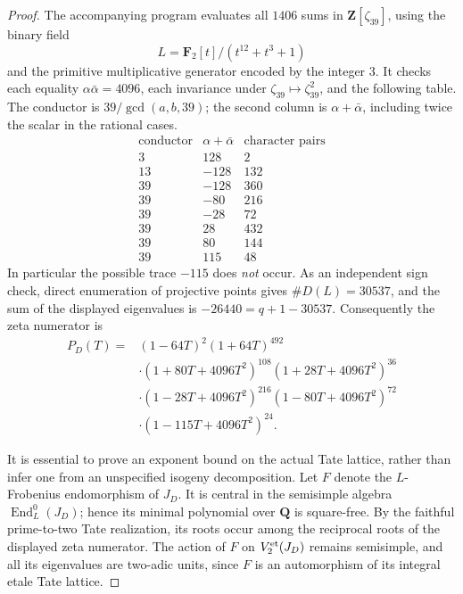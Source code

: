 \documentclass[11pt]{article}
\begin{document}
\begin{proof}
The accompanying program evaluates all \(1406\) sums in
\(\mathbf Z[\zeta_{39}]\), using the binary field
\[
              L=\mathbf F_2[t]/(t^{12}+t^3+1)
\]
and the primitive multiplicative generator encoded by the
integer \(3\). It checks each equality
\(\alpha\bar\alpha=4096\), each invariance under
\(\zeta_{39}\mapsto\zeta_{39}^2\), and the following table.
The conductor is \(39/\gcd(a,b,39)\); the second column
is \(\alpha+\bar\alpha\), including twice the scalar in
the rational cases.
\[
\begin{array}{r|r|r}
 \text{conductor}&\alpha+\bar\alpha&\text{character pairs}\\ \hline
 3&128&2\\
 13&-128&132\\
 39&-128&360\\
 39&-80&216\\
 39&-28&72\\
 39&28&432\\
 39&80&144\\
 39&115&48
\end{array}
\]
In particular the possible trace \(-115\) does \emph{not}
occur. As an independent sign check, direct enumeration
of projective points gives \(\#D(L)=30537\), and the
sum of the displayed eigenvalues is \(-26440=q+1-30537\).
Consequently the zeta numerator is
\[
\begin{aligned}
 P_D(T)={}&(1-64T)^2(1+64T)^{492}\\
 &\cdot(1+80T+4096T^2)^{108}
        (1+28T+4096T^2)^{36}\\
 &\cdot(1-28T+4096T^2)^{216}
        (1-80T+4096T^2)^{72}\\
 &\cdot(1-115T+4096T^2)^{24}.
\end{aligned}
\]

It is essential to prove an exponent bound on the actual
Tate lattice, rather than infer one from an unspecified
isogeny decomposition. Let \(F\) denote the \(L\)-Frobenius
endomorphism of \(J_D\). It is central in the semisimple
algebra \(\operatorname{End}_L^0(J_D)\); hence its minimal
polynomial over \(\mathbf Q\) is square-free. By the
faithful prime-to-two Tate realization, its roots occur
among the reciprocal roots of the displayed zeta numerator. The action
of \(F\) on \(V_2^{\rm et}(J_D)\) remains semisimple,
and all its eigenvalues are two-adic units, since \(F\)
is an automorphism of its integral etale Tate lattice.


\end{proof}
\end{document}
